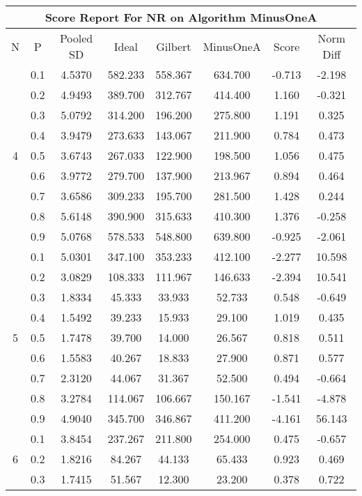 \documentclass[11pt,a4paper]{report}
\begin{document}
\begin{longtable}{ | c | c || c | c | c | c | c | c | }
\hline
\multicolumn{8}{|c|}{ Score Report For NR on Algorithm MinusOneA} \\
\hline
N & P & Pooled SD &  Ideal &  Gilbert & MinusOneA  & Score & Norm Diff \\
 \hline
 \hline
 \endhead
\multirow{9}{*}{4} & 0.1 & 4.5370 & 582.233 & 558.367 & 634.700 & -0.713 & -2.198 \\
 & 0.2 & 4.9493 & 389.700 & 312.767 & 414.400 & 1.160 & -0.321 \\
 & 0.3 & 5.0792 & 314.200 & 196.200 & 275.800 & 1.191 & 0.325 \\
 & 0.4 & 3.9479 & 273.633 & 143.067 & 211.900 & 0.784 & 0.473 \\
 & 0.5 & 3.6743 & 267.033 & 122.900 & 198.500 & 1.056 & 0.475 \\
 & 0.6 & 3.9772 & 279.700 & 137.900 & 213.967 & 0.894 & 0.464 \\
 & 0.7 & 3.6586 & 309.233 & 195.700 & 281.500 & 1.428 & 0.244 \\
 & 0.8 & 5.6148 & 390.900 & 315.633 & 410.300 & 1.376 & -0.258 \\
 & 0.9 & 5.0768 & 578.533 & 548.800 & 639.800 & -0.925 & -2.061 \\
 \hline
\multirow{9}{*}{5} & 0.1 & 5.0301 & 347.100 & 353.233 & 412.100 & -2.277 & 10.598 \\
 & 0.2 & 3.0829 & 108.333 & 111.967 & 146.633 & -2.394 & 10.541 \\
 & 0.3 & 1.8334 & 45.333 & 33.933 & 52.733 & 0.548 & -0.649 \\
 & 0.4 & 1.5492 & 39.233 & 15.933 & 29.100 & 1.019 & 0.435 \\
 & 0.5 & 1.7478 & 39.700 & 14.000 & 26.567 & 0.818 & 0.511 \\
 & 0.6 & 1.5583 & 40.267 & 18.833 & 27.900 & 0.871 & 0.577 \\
 & 0.7 & 2.3120 & 44.067 & 31.367 & 52.500 & 0.494 & -0.664 \\
 & 0.8 & 3.2784 & 114.067 & 106.667 & 150.167 & -1.541 & -4.878 \\
 & 0.9 & 4.9040 & 345.700 & 346.867 & 411.200 & -4.161 & 56.143 \\
 \hline
\multirow{9}{*}{6} & 0.1 & 3.8454 & 237.267 & 211.800 & 254.000 & 0.475 & -0.657 \\
 & 0.2 & 1.8216 & 84.267 & 44.133 & 65.433 & 0.923 & 0.469 \\
 & 0.3 & 1.7415 & 51.567 & 12.300 & 23.200 & 0.378 & 0.722 \\

\end{longtable}
\end{document}
